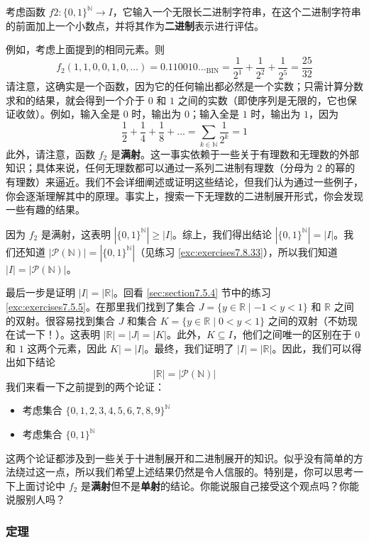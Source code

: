 \begin{example}
    考虑函数 $f2 : \{0, 1\}^{\mathbb{N}} \to I$，它输入一个无限长二进制字符串，在这个二进制字符串的前面加上一个小数点，并将其作为\textbf{二进制}表示进行评估。

    例如，考虑上面提到的相同元素。则
    \[f_2(1, 1, 0, 0, 1, 0, \dots) = 0.110010 \dots _\text{BIN} = \frac{1}{2^1}+\frac{1}{2^2}+\frac{1}{2^5} = \frac{25}{32}\]
    请注意，这确实是一个函数，因为它的任何输出都必然是一个实数；只需计算分数求和的结果，就会得到一个介于 $0$ 和 $1$ 之间的实数（即使序列是无限的，它也保证收敛）。例如，输入全是 $0$ 时，输出为 $0$；输入全是 $1$ 时，输出为 $1$，因为
    \[\frac{1}{2}+\frac{1}{4}+\frac{1}{8}+\dots = \sum_{k \in \mathbb{N}} \frac{1}{2^k} = 1\]
    此外，请注意，函数 $f_2$ 是\textbf{满射}。这一事实依赖于一些关于有理数和无理数的外部知识；具体来说，任何无理数都可以通过一系列二进制有理数（分母为 $2$ 的幂的有理数）来逼近。我们不会详细阐述或证明这些结论，但我们认为通过一些例子，你会逐渐理解其中的原理。事实上，搜索一下无理数的二进制展开形式，你会发现一些有趣的结果。

    因为 $f_2$ 是满射，这表明 $|\{0,1\}^{\mathbb{N}}| \ge |I|$。综上，我们得出结论 $|\{0,1\}^{\mathbb{N}}| = |I|$。我们还知道 $|\mathcal{P}(\mathbb{N})| = |\{0, 1\}^{\mathbb{N}}|$（见练习 \ref{exc:exercises7.8.33}），所以我们知道 $|I| = |\mathcal{P}(\mathbb{N})|$。

    最后一步是证明 $|I| = |\mathbb{R}|$。回看 \ref{sec:section7.5.4} 节中的练习 \ref{exc:exercises7.5.5}。在那里我们找到了集合 $J = \{y \in \mathbb{R} \mid -1 < y < 1\}$ 和 $\mathbb{R}$ 之间的双射。很容易找到集合 $J$ 和集合 $K = \{y \in \mathbb{R} \mid 0 < y < 1\}$ 之间的双射（不妨现在试一下！）。这表明 $|\mathbb{R}| = |J| = |K|$。此外，$K \subseteq I$，他们之间唯一的区别在于 $0$ 和 $1$ 这两个元素，因此 $K| = |I|$。最终，我们证明了 $|I| = |\mathbb{R}|$。因此，我们可以得出如下结论
    \[|\mathbb{R}| = |\mathcal{P}(\mathbb{N})|\]
    我们来看一下之前提到的两个论证：
    \begin{itemize}
        \item 考虑集合 $\{0, 1, 2, 3, 4, 5, 6, 7, 8, 9\}^\mathbb{N}$
        \item 考虑集合 $\{0, 1\}^\mathbb{N}$
    \end{itemize}
    这两个论证都涉及到一些关于十进制展开和二进制展开的知识。似乎没有简单的方法绕过这一点，所以我们希望上述结果仍然是令人信服的。特别是，你可以思考一下上面讨论中 $f_2$ 是\textbf{满射}但不是\textbf{单射}的结论。你能说服自己接受这个观点吗？你能说服别人吗？
\end{example}

\subsubsection*{定理}


